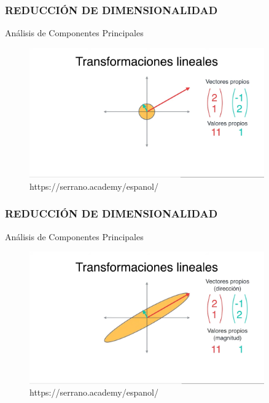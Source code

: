 \documentclass{beamer}
\begin{document}
\begin{frame}
	\frametitle{REDUCCIÓN DE DIMENSIONALIDAD}
	\begin{block}{Análisis de Componentes Principales}	
		\begin{figure}
			\includegraphics[width=0.9\textwidth]{PCA/IMG_3576.jpg}
			\caption{https://serrano.academy/espanol/}
		\end{figure}
	\end{block}
\end{frame}



\begin{frame}
	\frametitle{REDUCCIÓN DE DIMENSIONALIDAD}
	\begin{block}{Análisis de Componentes Principales}	
		\begin{figure}
			\includegraphics[width=0.9\textwidth]{PCA/IMG_3578.jpg}
			\caption{https://serrano.academy/espanol/}
		\end{figure}
	\end{block}
\end{frame}
\end{document}
